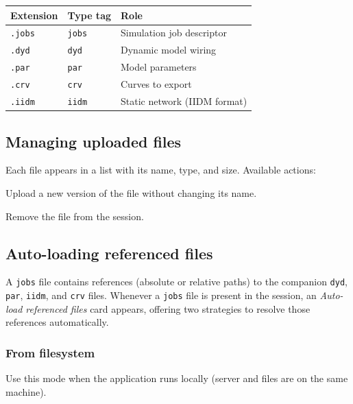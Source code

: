 \documentclass[a4paper,11pt]{article}
\newcommand{\code}[1]{\texttt{\small #1}}
\newcommand{\ftype}[1]{\texttt{\small\color{rteblu}#1}}
\begin{document}
\begin{center}
\begin{tabularx}{0.75\linewidth}{llX}
\toprule
\textbf{Extension} & \textbf{Type tag} & \textbf{Role} \\
\midrule
\code{.jobs}  & \ftype{jobs}  & Simulation job descriptor \\
\code{.dyd}   & \ftype{dyd}   & Dynamic model wiring \\
\code{.par}   & \ftype{par}   & Model parameters \\
\code{.crv}   & \ftype{crv}   & Curves to export \\
\code{.iidm}  & \ftype{iidm}  & Static network (IIDM format) \\
\bottomrule
\end{tabularx}
\end{center}

\subsection{Managing uploaded files}

Each file appears in a list with its name, type, and size. Available actions:

\begin{description}[leftmargin=2em]
  \item[\textbf{Replace}] Upload a new version of the file without changing its
    name.
  \item[\textbf{Unload}] Remove the file from the session.
\end{description}

\subsection{Auto-loading referenced files}
\label{sec:autoload}

A \ftype{jobs} file contains references (absolute or relative paths) to the
companion \ftype{dyd}, \ftype{par}, \ftype{iidm}, and \ftype{crv} files.
Whenever a \ftype{jobs} file is present in the session, an
\emph{Auto-load referenced files} card appears, offering two strategies to
resolve those references automatically.

\subsubsection{From filesystem}

Use this mode when the application runs locally (server and files are on the
same machine).
\end{document}
